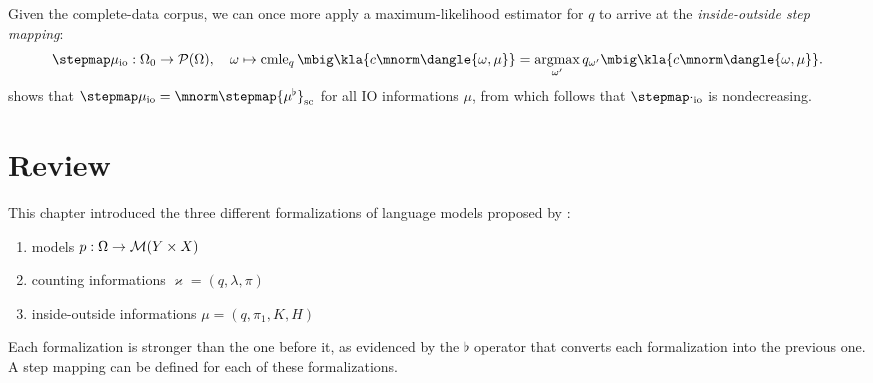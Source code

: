 Given the complete-data corpus, we can once more apply a maximum-likelihood
estimator for $q$ to arrive at the \emph{inside-outside step mapping}:
\[
 \stepmap\mu_\mathrm{io}: \Omega_0 \to \up(\Omega), \quad
 \omega \mapsto \cmle_q\mbig\kla{c\mnorm\dangle{\omega,\mu}} = \argmax_{\omega'} q_{\omega'}\mbig\kla{c\mnorm\dangle{\omega,\mu}}.
\]
\cite[pp.~16]{bucstuvog15} shows that $\stepmap\mu_\mathrm{io} =
\mnorm\stepmap{\mu^\flat}_\mathrm{sc}$ for all IO informations $\mu$, from
which follows that $\stepmap\cdot_\mathrm{io}$ is nondecreasing.

\section{Review}

This chapter introduced the three different formalizations of language models
proposed by \cite{bucstuvog15}:
\begin{enumerate}
 \item models $p:\Omega\to\mathcal M(Y\times X)$
 \item counting informations $\varkappa=(q,\lambda,\pi)$
 \item inside-outside informations $\mu=(q,\pi_1,K,H)$
\end{enumerate}
Each formalization is stronger than the one before it, as evidenced by the
$\flat$ operator that converts each formalization into the previous one.
A step mapping can be defined for each of these formalizations.
\begin{center}\end{center}

